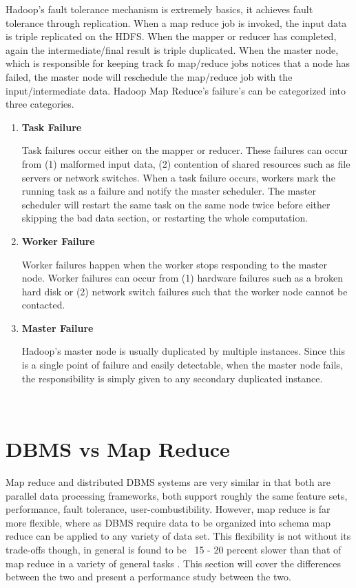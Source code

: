 \documentclass[10pt,twocolumn]{IEEEtran11}
\begin{document}
Hadoop's fault tolerance mechanism is extremely basics, it achieves fault tolerance through replication.  When a map reduce job is invoked, the input data is triple replicated on the HDFS.  When the mapper or reducer has completed, again the intermediate/final result is triple duplicated.  When the master node, which is responsible for keeping track fo map/reduce jobs notices that a node has failed, the master node will reschedule the map/reduce job with the input/intermediate data.  Hadoop Map Reduce's failure's can be categorized into three categories.
\ \\
\begin{enumerate}
	\setlength\itemsep{1em}
	\item 
	
	\textbf{Task Failure}
	
	Task failures occur either on the mapper or reducer.  These failures can occur from (1) malformed input data, (2) contention of shared resources such as file servers or network switches.
	When a task failure occurs, workers mark the running task as a failure and notify the master scheduler.  The master scheduler will restart the same task on the same node twice before either skipping the bad data section, or restarting the whole computation.
	\item 
	
	\textbf{Worker Failure}
	
	Worker failures happen when the worker stops responding to the master node.  Worker failures can occur from (1) hardware failures such as a broken hard disk or (2) network switch failures such that the worker node cannot be contacted.
	
	\item 
	
	\textbf{Master Failure}
	
	Hadoop's master node is usually duplicated by multiple instances.  Since this is a single point of failure and easily detectable, when the master node fails, the responsibility is simply given to any secondary duplicated instance.
\end{enumerate}
\ \\

\section{DBMS vs Map Reduce}
Map reduce and distributed DBMS systems are very similar in that both are parallel data processing frameworks, both support roughly the same feature sets, performance, fault tolerance, user-combustibility.  However, map reduce is far more flexible,  where  as DBMS require data to be organized into schema map reduce can be applied to any variety of data set.  This flexibility is not without its trade-offs though, in general is found to be ~15 - 20 percent slower than that of map reduce in a variety of general tasks \cite{pavlo2009comparison}.  This section will cover the differences between the two and present a performance study between the two.
\end{document}
